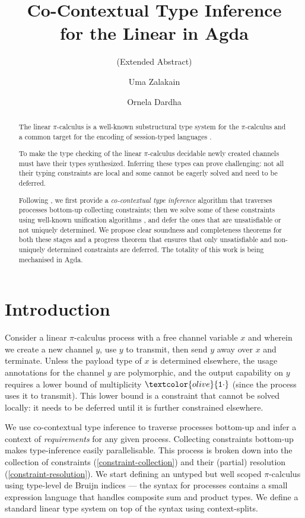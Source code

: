 \documentclass[sigplan,screen,review]{acmart}
\title
[Co-Contextual Type Inference for the Linear \Picalc{} in Agda]
{Co-Contextual Type Inference \\ for the Linear \Picalc{} in Agda}
\subtitle{(Extended Abstract)}
\author{Uma Zalakain}
\affiliation{University of Glasgow}
\author{Ornela Dardha}
\affiliation{University of Glasgow}
\newcommand{\picalc}{$\pi$-calculus}
\newcommand{\constr}[1]{\textcolor{olive}{\mathtt{#1}}}
\newcommand{\tone}{\constr{1\cdot}}
\begin{document}
\begin{abstract}
  The linear \picalc{} is a well-known substructural type system for the \picalc{} and a common target for the encoding of session-typed languages \cite{DardhaGS17}.

  To make the type checking of the linear \picalc{} decidable newly created channels must have their types synthesized.
  Inferring these types can prove challenging: not all their typing constraints are local and some cannot be eagerly solved and need to be deferred.

  Following \cite{Padovani15}, we first provide a \emph{co-contextual type inference} \cite{ErdwegBKKM15} algorithm that traverses processes bottom-up collecting constraints; then we solve some of these constraints using well-known unification algorithms \cite{McBride03}, and defer the ones that are unsatisfiable or not uniquely determined.
  We propose clear soundness and completeness theorems for both these stages and a progress theorem that ensures that only unsatisfiable and non-uniquely determined constraints are deferred.
  The totality of this work is being mechanised in Agda.
\end{abstract}


\maketitle

\section{Introduction}\label{introduction}

Consider a linear \picalc{} process with a free channel variable $x$ and wherein we create a new channel $y$, use $y$ to transmit, then send $y$ away over $x$ and terminate.
Unless the payload type of $x$ is determined elsewhere, the usage annotations for the channel $y$ are polymorphic, and the output capability on $y$ requires a lower bound of multiplicity $\tone$ (since the process uses it to transmit).
This lower bound is a constraint that cannot be solved locally: it needs to be deferred until it is further constrained elsewhere.

We use co-contextual type inference \cite{ErdwegBKKM15} to traverse processes bottom-up and infer a context of \emph{requirements} for any given process.
Collecting constraints bottom-up makes type-inference easily parallelisable.
This process is broken down into the collection of constraints (\autoref{constraint-collection}) and their (partial) resolution (\autoref{constraint-resolution}).
We start defining an untyped but well scoped \picalc{} using type-level de Bruijn \cite{deBruijn72} indices --- the syntax for processes contains a small expression language that handles composite sum and product types.
We define a standard linear type system on top of the syntax using context-splits.
\end{document}
